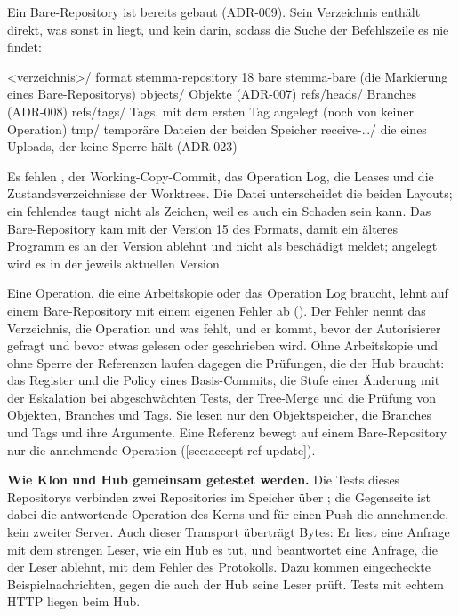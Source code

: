 Ein Bare-Repository ist bereits gebaut (ADR-009).
Sein Verzeichnis enthält direkt, was sonst in  liegt, und kein 
darin, sodass die Suche der Befehlszeile es nie findet:

\starttyping
<verzeichnis>/
    format        stemma-repository 18
    bare          stemma-bare (die Markierung eines Bare-Repositorys)
    objects/      Objekte (ADR-007)
    refs/heads/   Branches (ADR-008)
    refs/tags/    Tags, mit dem ersten Tag angelegt (noch von keiner Operation)
    tmp/          temporäre Dateien der beiden Speicher
      receive-…/  die eines Uploads, der keine Sperre hält (ADR-023)
\stoptyping

Es fehlen , der Working-Copy-Commit, das Operation Log, die Leases und die
Zustandsverzeichnisse der Worktrees.
Die Datei  unterscheidet die beiden Layouts; ein fehlendes  taugt nicht
als Zeichen, weil es auch ein Schaden sein kann.
Das Bare-Repository kam mit der Version 15 des Formats, damit ein älteres Programm es an der
Version ablehnt und nicht als beschädigt meldet; angelegt wird es in der jeweils aktuellen
Version.

Eine Operation, die eine Arbeitskopie oder das Operation Log braucht, lehnt auf einem
Bare-Repository mit einem eigenen Fehler ab ().
Der Fehler nennt das Verzeichnis, die Operation und was fehlt, und er kommt, bevor der
Autorisierer gefragt und bevor etwas gelesen oder geschrieben wird.
Ohne Arbeitskopie und ohne Sperre der Referenzen laufen dagegen die Prüfungen, die der Hub
braucht: das Register und die Policy eines Basis-Commits, die Stufe einer Änderung mit der
Eskalation bei abgeschwächten Tests, der Tree-Merge und die Prüfung von Objekten, Branches und
Tags.
Sie lesen nur den Objektspeicher, die Branches und Tags und ihre Argumente.
Eine Referenz bewegt auf einem Bare-Repository nur die annehmende Operation
([sec:accept-ref-update]).

\startinfobox
{\bf Wie Klon und Hub gemeinsam getestet werden.}
Die Tests dieses Repositorys verbinden zwei Repositories im Speicher über ; die
Gegenseite ist dabei die antwortende Operation des Kerns und für einen Push die annehmende,
kein zweiter Server.
Auch dieser Transport überträgt Bytes: Er liest eine Anfrage mit dem strengen Leser, wie ein Hub
es tut, und beantwortet eine Anfrage, die der Leser ablehnt, mit dem Fehler des Protokolls.
Dazu kommen eingecheckte Beispielnachrichten, gegen die auch der Hub seine Leser prüft.
Tests mit echtem HTTP liegen beim Hub.
\stopinfobox

